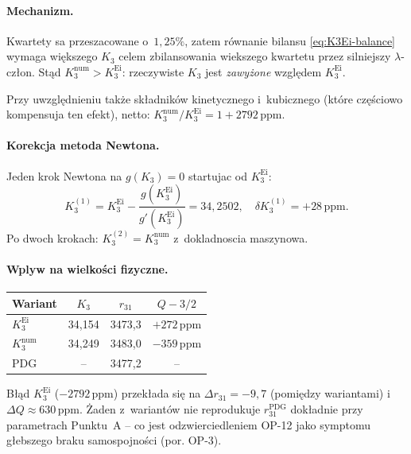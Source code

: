\paragraph{Mechanizm.}
Kwartety sa przeszacowane o~$1{,}25\%$, zatem r\'ownanie bilansu
\eqref{eq:K3Ei-balance} wymaga wi\k{e}kszego $K_3$ celem
zbilansowania wiekszego kwartetu przez silniejszy $\lambda$-cz\l{}on.
St\k{a}d $K_3^{\mathrm{num}} > K_3^{\mathrm{Ei}}$:
rzeczywiste $K_3$ jest \emph{zawy\.zone} wzgl\k{e}dem $K_3^{\mathrm{Ei}}$. \smallskip

Przy uwzgl\k{e}dnieniu tak\.ze sk\l{}adnik\'ow kinetycznego i~kubicznego
(kt\'ore cz\k{e}\'sciowo kompensuja ten efekt),
netto: $K_3^{\mathrm{num}}/K_3^{\mathrm{Ei}} = 1 + 2792\,\mathrm{ppm}$.

\paragraph{Korekcja metoda Newtona.}
Jeden krok Newtona na $g(K_3)=0$ startujac od $K_3^{\mathrm{Ei}}$:
\begin{equation}
  K_3^{(1)} = K_3^{\mathrm{Ei}} - \frac{g(K_3^{\mathrm{Ei}})}{g'(K_3^{\mathrm{Ei}})}
  = 34{,}2502,\quad
  \delta K_3^{(1)} = +28\,\mathrm{ppm}.
  \label{eq:K3-newton}
\end{equation}
Po dwoch krokach: $K_3^{(2)} = K_3^{\mathrm{num}}$ z~dokladnoscia maszynowa.

\paragraph{Wplyw na wielko\'sci fizyczne.}
\begin{center}
\begin{tabular}{lccc}
\hline
Wariant & $K_3$ & $r_{31}$ & $Q - 3/2$ \\
\hline
$K_3^{\mathrm{Ei}}$ & 34{,}154 & 3473{,}3 & $+272\,\mathrm{ppm}$ \\
$K_3^{\mathrm{num}}$& 34{,}249 & 3483{,}0 & $-359\,\mathrm{ppm}$ \\
PDG                 & --       & 3477{,}2 & -- \\
\hline
\end{tabular}
\end{center}
B\l{}\k{a}d $K_3^{\mathrm{Ei}}$ ($-2792\,\mathrm{ppm}$) przek\l{}ada si\k{e} na
$\Delta r_{31} = -9{,}7$ (pomi\k{e}dzy wariantami) i~$\Delta Q \approx 630\,\mathrm{ppm}$.
\.Zaden z~wariant\'ow nie reprodukuje $r_{31}^{\mathrm{PDG}}$ dok\l{}adnie
przy parametrach Punktu~A -- co jest odzwierciedleniem OP-12 jako symptomu
g\l{}ebszego braku samospojno\'sci (por. OP-3).

